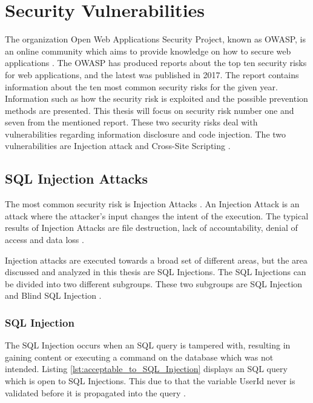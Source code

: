 \section{Security Vulnerabilities}
\label{SecurityVulnerabilities}
The organization Open Web Applications Security Project, known as OWASP, is an online community which aims to provide knowledge on how to secure web applications \parencite{OpenWebApplicationSecurityProject}. The OWASP has produced reports about the top ten security risks for web applications, and the latest was published in 2017. The report contains information about the ten most common security risks for the given year. Information such as how the security risk is exploited and the possible prevention methods are presented. This thesis will focus on security risk number one and seven from the mentioned report. These two security risks deal with vulnerabilities regarding information disclosure and code injection. The two vulnerabilities are Injection attack and Cross-Site Scripting \parencite{OWASP2017}.



\subsection{SQL Injection Attacks}
The most common security risk is Injection Attacks \parencite{OWASP2017}. An Injection Attack is an attack where the attacker's input changes the intent of the execution. The typical results of Injection Attacks are file destruction, lack of accountability, denial of access and data loss \parencite{Secure_Web}.

Injection attacks are executed towards a broad set of different areas, but the area discussed and analyzed in this thesis are SQL Injections. The SQL Injections can be divided into two different subgroups. These two subgroups are SQL Injection and Blind SQL Injection \parencite{Secure_Web}.



\subsubsection{SQL Injection}
The SQL Injection occurs when an SQL query is tampered with, resulting in gaining content or executing a command on the database which was not intended. Listing \ref{lst:acceptable_to_SQL_Injection} displays an SQL query which is open to SQL Injections. This due to that the variable UserId never is validated before it is propagated into the query \parencite{JustinClarke-Salt2009SIAa, Secure_Web}.

